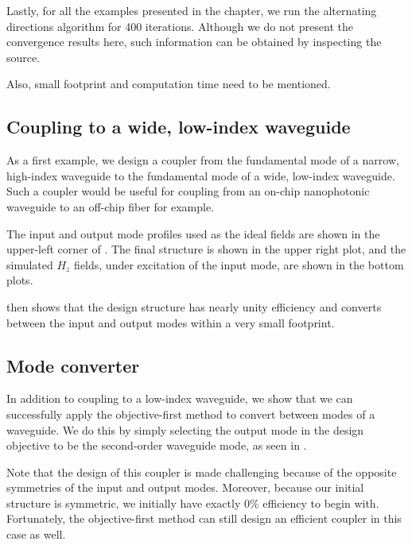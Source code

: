 Lastly, for all the examples presented in the chapter,
    we run the alternating directions algorithm for 400 iterations.
Although we do not present the convergence results here,
    such information can be obtained by inspecting the source. %

Also, small footprint and computation time need to be mentioned.
\subsection{Coupling to a wide, low-index waveguide}
As a first example, we design a coupler from 
    the fundamental mode of a narrow, high-index waveguide
    to the fundamental mode of a wide, low-index waveguide.
Such a coupler would be useful for coupling from 
    an on-chip nanophotonic waveguide to
    an off-chip fiber for example.


The input and output mode profiles used as
    the ideal fields are shown in the upper-left corner of .
The final structure is shown in the upper right plot, and
    the simulated $H_z$ fields,
    under excitation of the input mode,
    are shown in the bottom plots.

 then shows that the design structure has nearly unity efficiency
    and converts between the input and output modes
    within a very small footprint.

\subsection{Mode converter}
In addition to coupling to a low-index waveguide,
    we show that we can successfully apply the objective-first method
    to convert between modes of a waveguide.
We do this by simply selecting the output mode 
    in the design objective to be the second-order waveguide mode,
    as seen in .

Note that the design of this coupler is made challenging
    because of the opposite symmetries of the input and output modes.
Moreover, because our initial structure is symmetric,
    we initially have exactly 0\% efficiency to begin with.
Fortunately, the objective-first method can still design
    an efficient coupler in this case as well.

